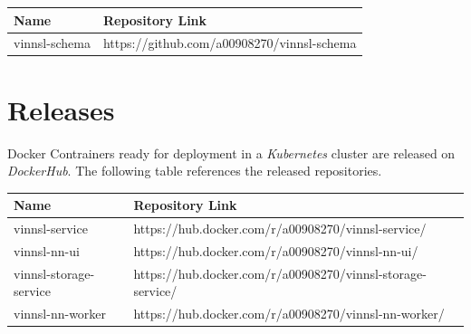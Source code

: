 \begin{longtable}[]{@{}ll@{}}
\toprule
Name & Repository Link\tabularnewline
\midrule
\endhead
vinnsl-schema &
https://github.com/a00908270/vinnsl-schema\tabularnewline
\bottomrule
\end{longtable}

\section{Releases}\label{releases}

Docker Contrainers ready for deployment in a \emph{Kubernetes} cluster
are released on \emph{DockerHub}. The following table references the
released repositories.

\begin{longtable}[]{@{}ll@{}}
\toprule
\begin{minipage}[b]{0.26\columnwidth}\raggedright\strut
Name\strut
\end{minipage} & \begin{minipage}[b]{0.68\columnwidth}\raggedright\strut
Repository Link\strut
\end{minipage}\tabularnewline
\midrule
\endhead
\begin{minipage}[t]{0.26\columnwidth}\raggedright\strut
vinnsl-service\strut
\end{minipage} & \begin{minipage}[t]{0.68\columnwidth}\raggedright\strut
https://hub.docker.com/r/a00908270/vinnsl-service/\strut
\end{minipage}\tabularnewline
\begin{minipage}[t]{0.26\columnwidth}\raggedright\strut
vinnsl-nn-ui\strut
\end{minipage} & \begin{minipage}[t]{0.68\columnwidth}\raggedright\strut
https://hub.docker.com/r/a00908270/vinnsl-nn-ui/\strut
\end{minipage}\tabularnewline
\begin{minipage}[t]{0.26\columnwidth}\raggedright\strut
vinnsl-storage-service\strut
\end{minipage} & \begin{minipage}[t]{0.68\columnwidth}\raggedright\strut
https://hub.docker.com/r/a00908270/vinnsl-storage-service/\strut
\end{minipage}\tabularnewline
\begin{minipage}[t]{0.26\columnwidth}\raggedright\strut
vinnsl-nn-worker\strut
\end{minipage} & \begin{minipage}[t]{0.68\columnwidth}\raggedright\strut
https://hub.docker.com/r/a00908270/vinnsl-nn-worker/\strut
\end{minipage}\tabularnewline
\bottomrule
\end{longtable}

